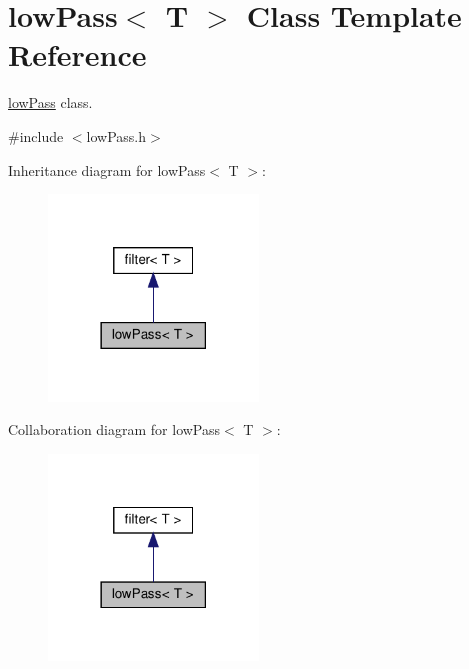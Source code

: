 \hypertarget{classlowPass}{}\section{low\+Pass$<$ T $>$ Class Template Reference}
\label{classlowPass}


\hyperlink{classlowPass}{low\+Pass} class.  




{\ttfamily \#include $<$low\+Pass.\+h$>$}



Inheritance diagram for low\+Pass$<$ T $>$\+:\nopagebreak
\begin{figure}[H]
\begin{center}
\leavevmode
\includegraphics[width=158pt]{classlowPass__inherit__graph}
\end{center}
\end{figure}


Collaboration diagram for low\+Pass$<$ T $>$\+:\nopagebreak
\begin{figure}[H]
\begin{center}
\leavevmode
\includegraphics[width=158pt]{classlowPass__coll__graph}
\end{center}
\end{figure}
